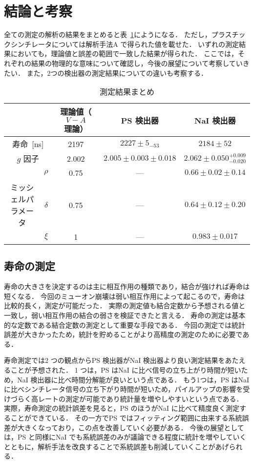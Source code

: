 \section{結論と考察}
全ての測定の解析の結果をまとめると表~\ref{tab:result_conclusion}にようになる．
ただし，プラスチックシンチレータについては解析手法A で得られた値を載せた．
いずれの測定結果においても，理論値と誤差の範囲で一致した結果が得られた．
ここでは，それぞれの結果の物理的な意味について確認し，今後の展望について考察していきたい．
また，2つの検出器の測定結果についての違いも考察する．

\begin{table}[h]
\centering
\caption{測定結果まとめ}
\label{tab:result_conclusion}
\begin{tabular}{ccccc}\toprule
{} & {} & 理論値（$V-A$理論） & PS 検出器 & NaI 検出器\\ \midrule
\multicolumn{2}{c}{寿命~[ns]} &  2197 & $2227 \pm 5_{- 53}$ & $2184 \pm 52$\\
\multicolumn{2}{c}{$g$ 因子} & 2.002 & $2.005 \pm 0.003 \pm 0.018$ & $2.062 \pm 0.050^{+0.009}_{-0.020}$\\ 
{} & $\rho$ & 0.75 & --- & $0.66 \pm 0.02 \pm 0.14$\\
ミッシェルパラメータ & $\delta$ & 0.75 & --- & $0.64 \pm 0.12 \pm 0.20$\\
{} & $\xi$ & 1 & --- & $0.983 \pm 0.017$\\ \bottomrule
\end{tabular}
\end{table}%

\subsection{寿命の測定}
寿命の大きさを決定するのは主に相互作用の種類であり，結合が強ければ寿命は短くなる．
今回のミューオン崩壊は弱い相互作用によって起こるので，寿命は比較的長く，測定が可能だった．
実際の測定値も結合定数から予想される値と一致し，弱い相互作用の結合の弱さを検証できたと言える．
寿命の測定は基本的な定数である結合定数の測定として重要な手段である．
今回の測定では統計誤差が大きかったため，統計を貯めることがより高精度の測定のために必要である．

寿命測定では2 つの観点からPS 検出器がNaI 検出器より良い測定結果をあたえることが予想された．
1 つは，PS はNaI に比べ信号の立ち上がり時間が短いため，NaI 検出器に比べ時間分解能が良いという点である．
もう1つは，PS はNaI に比べシンチレータ信号の立ち下がり時間が短いため，パイルアップの影響を受けづらく高レートの測定が可能であり統計量を増やしやすいという点である．
実際，寿命測定の統計誤差を見ると，PS のほうがNaI に比べて精度良く測定することができている．
その一方でPS ではフィッティング範囲に由来する系統誤差が大きくなっており，この点を改善していく必要がある．
今後の展望としては，PS と同様にNaI でも系統誤差のみが議論できる程度に統計を増やしていくとともに，解析手法を改良することで系統誤差も削減していくことがあげられる．%

